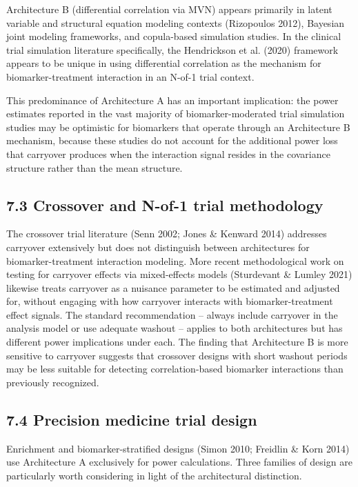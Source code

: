 \documentclass[
]{article}
\begin{document}
Architecture B (differential correlation via MVN) appears
primarily in latent variable and structural equation modeling
contexts (Rizopoulos 2012), Bayesian joint modeling frameworks,
and copula-based simulation studies. In the clinical trial
simulation literature specifically, the Hendrickson et al.
(2020) framework appears to be unique in using differential
correlation as the mechanism for biomarker-treatment
interaction in an N-of-1 trial context.

This predominance of Architecture A has an important implication:
the power estimates reported in the vast majority of
biomarker-moderated trial simulation studies may be optimistic
for biomarkers that operate through an Architecture B mechanism,
because these studies do not account for the additional power
loss that carryover produces when the interaction signal resides
in the covariance structure rather than the mean structure.

\subsection{7.3 Crossover and N-of-1 trial methodology}

The crossover trial literature (Senn 2002; Jones \& Kenward
2014) addresses carryover extensively but does not distinguish
between architectures for biomarker-treatment interaction
modeling. More recent methodological work on testing for
carryover effects via mixed-effects models (Sturdevant \& Lumley
2021) likewise treats carryover as a nuisance parameter to be
estimated and adjusted for, without engaging with how carryover
interacts with biomarker-treatment effect signals. The
standard recommendation -- always include carryover in the
analysis model or use adequate washout -- applies to both
architectures but has different power implications under each.
The finding that Architecture B is more sensitive to carryover
suggests that crossover designs with short washout periods may
be less suitable for detecting correlation-based biomarker
interactions than previously recognized.

\subsection{7.4 Precision medicine trial design}

Enrichment and biomarker-stratified designs (Simon 2010;
Freidlin \& Korn 2014) use Architecture A exclusively for power
calculations. Three families of design are particularly worth
considering in light of the architectural distinction.
\end{document}
